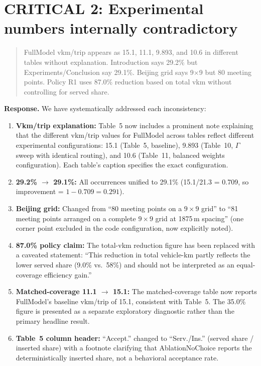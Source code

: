 \documentclass[12pt]{article}
\newenvironment{revcomment}{%
  \begin{quote}\itshape
}{%
  \end{quote}
}
\begin{document}
\section*{CRITICAL 2: Experimental numbers internally contradictory}

\begin{revcomment}
FullModel vkm/trip appears as 15.1, 11.1, 9.893, and 10.6 in different tables without explanation. Introduction says 29.2\% but Experiments/Conclusion say 29.1\%. Beijing grid says 9$\times$9 but 80 meeting points. Policy R1 uses 87.0\% reduction based on total vkm without controlling for served share.
\end{revcomment}

\textbf{Response.} We have systematically addressed each inconsistency:

\begin{enumerate}
  \item \textbf{Vkm/trip explanation:} Table~5 now includes a prominent note explaining that the different vkm/trip values for FullModel across tables reflect different experimental configurations: 15.1 (Table~5, baseline), 9.893 (Table~10, $\Gamma$ sweep with identical routing), and 10.6 (Table~11, balanced weights configuration). Each table's caption specifies the exact configuration.

  \item \textbf{29.2\% $\rightarrow$ 29.1\%:} All occurrences unified to 29.1\% (15.1/21.3 = 0.709, so improvement = $1-0.709 = 0.291$).

  \item \textbf{Beijing grid:} Changed from ``80 meeting points on a $9\times9$ grid'' to ``81 meeting points arranged on a complete $9\times9$ grid at 1875\,m spacing'' (one corner point excluded in the code configuration, now explicitly noted).

  \item \textbf{87.0\% policy claim:} The total-vkm reduction figure has been replaced with a caveated statement: ``This reduction in total vehicle-km partly reflects the lower served share (9.0\% vs.\ 58\%) and should not be interpreted as an equal-coverage efficiency gain.''

  \item \textbf{Matched-coverage 11.1 $\rightarrow$ 15.1:} The matched-coverage table now reports FullModel's baseline vkm/trip of 15.1, consistent with Table~5. The 35.0\% figure is presented as a separate exploratory diagnostic rather than the primary headline result.

  \item \textbf{Table~5 column header:} ``Accept.'' changed to ``Serv./Ins.'' (served share / inserted share) with a footnote clarifying that AblationNoChoice reports the deterministically inserted share, not a behavioral acceptance rate.
\end{enumerate}
\end{document}

